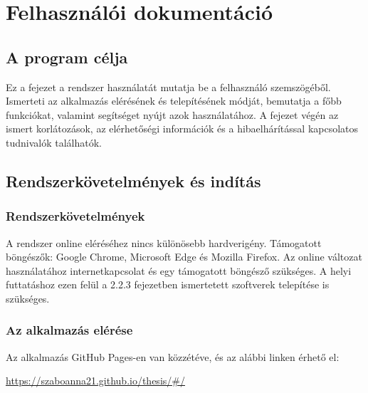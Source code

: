 \chapter{Felhasználói dokumentáció}
\label{ch:user}

\section{A program célja} 
Ez a fejezet a rendszer használatát mutatja be a felhasználó szemszögéből. Ismerteti az alkalmazás elérésének és telepítésének módját, bemutatja a főbb funkciókat, valamint segítséget nyújt azok használatához. A fejezet végén az ismert korlátozások, az elérhetőségi információk és a hibaelhárítással kapcsolatos tudnivalók találhatók.
\mbox{}

\section{Rendszerkövetelmények és indítás}
\subsection{Rendszerkövetelmények}
A rendszer online eléréséhez nincs különösebb hardverigény.
Támogatott böngészők: Google Chrome, Microsoft Edge és Mozilla Firefox.
Az online változat használatához internetkapcsolat és egy támogatott böngésző szükséges. A helyi futtatáshoz ezen felül a 2.2.3 fejezetben ismertetett szoftverek telepítése is szükséges.

\mbox{}

\subsection{Az alkalmazás elérése}
Az alkalmazás GitHub Pages-en van közzétéve, és az alábbi linken érhető el:
\begin{center}
  \url{https://szaboanna21.github.io/thesis/#/}
\end{center}

\mbox{}

